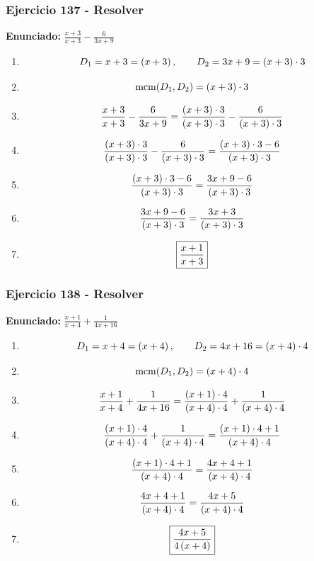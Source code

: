 \documentclass[11pt,a4paper]{article}
\newcommand{\fitmath}[1]{%
\[
\setbox0=\hbox{$\displaystyle #1$}%
\ifdim\wd0>\linewidth
\resizebox{\linewidth}{!}{$\displaystyle #1$}%
\else
#1%
\fi
\]
}
\begin{document}
\vspace{0.12cm}
\subsubsection*{Ejercicio 137 - Resolver}
\textbf{Enunciado:} $ \frac{x + 3}{x + 3} - \frac{6}{3 x + 9} $\par
\begin{enumerate}[leftmargin=2em]
\item \fitmath{D_1=x + 3=\left(x + 3\right),\qquad D_2=3 x + 9=\left(x + 3\right)\cdot 3}
\item \fitmath{\operatorname{mcm}(D_1,D_2)=\left(x + 3\right)\cdot 3}
\item \fitmath{\frac{x + 3}{x + 3} - \frac{6}{3 x + 9}= \frac{\left(x + 3\right)\cdot 3}{\left(x + 3\right)\cdot 3} - \frac{6}{\left(x + 3\right)\cdot 3}}
\item \fitmath{\frac{\left(x + 3\right)\cdot 3}{\left(x + 3\right)\cdot 3} - \frac{6}{\left(x + 3\right)\cdot 3}=\frac{\left(x + 3\right)\cdot 3 - 6}{\left(x + 3\right)\cdot 3}}
\item \fitmath{\frac{\left(x + 3\right)\cdot 3 - 6}{\left(x + 3\right)\cdot 3}=\frac{3 x + 9 - 6}{\left(x + 3\right)\cdot 3}}
\item \fitmath{\frac{3 x + 9 - 6}{\left(x + 3\right)\cdot 3}=\frac{3 x + 3}{\left(x + 3\right)\cdot 3}}
\item \fitmath{\boxed{\frac{x + 1}{x + 3}}}
\end{enumerate}

\vspace{0.12cm}
\subsubsection*{Ejercicio 138 - Resolver}
\textbf{Enunciado:} $ \frac{x + 1}{x + 4} + \frac{1}{4 x + 16} $\par
\begin{enumerate}[leftmargin=2em]
\item \fitmath{D_1=x + 4=\left(x + 4\right),\qquad D_2=4 x + 16=\left(x + 4\right)\cdot 4}
\item \fitmath{\operatorname{mcm}(D_1,D_2)=\left(x + 4\right)\cdot 4}
\item \fitmath{\frac{x + 1}{x + 4} + \frac{1}{4 x + 16}= \frac{\left(x + 1\right)\cdot 4}{\left(x + 4\right)\cdot 4} + \frac{1}{\left(x + 4\right)\cdot 4}}
\item \fitmath{\frac{\left(x + 1\right)\cdot 4}{\left(x + 4\right)\cdot 4} + \frac{1}{\left(x + 4\right)\cdot 4}=\frac{\left(x + 1\right)\cdot 4 + 1}{\left(x + 4\right)\cdot 4}}
\item \fitmath{\frac{\left(x + 1\right)\cdot 4 + 1}{\left(x + 4\right)\cdot 4}=\frac{4 x + 4 + 1}{\left(x + 4\right)\cdot 4}}
\item \fitmath{\frac{4 x + 4 + 1}{\left(x + 4\right)\cdot 4}=\frac{4 x + 5}{\left(x + 4\right)\cdot 4}}
\item \fitmath{\boxed{\frac{4 x + 5}{4 \left(x + 4\right)}}}
\end{enumerate}
\end{document}
